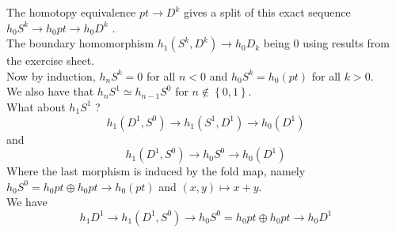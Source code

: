 \documentclass[../main.tex]{subfiles}
\begin{document}
The homotopy equivalence $pt \to D^{k}$ gives a split of this exact sequence $h_0S^{k}\to h_0 pt\to h_0 D^{k}$ .\\
The boundary homomorphism $h_1 ( S^{k},D^{k}) \to h_0 D_k$ being 0 using results from the exercise sheet.\\

Now by induction, $h_n S^{k}=0  $ for all $n< 0$ and $h_0 S^{k}= h_0( pt) $ for all $k>0$.\\
We also have that $h_n S^{1}\simeq h_{n-1} S^{0}$ for $ n \notin \left\{ 0,1 \right\} $.\\
What about $h_1 S^{1}$ ?\\
\[ 
h_1( D^{1},S^{0}) \to h_1( S^{1},D^{1}) \to h_0( D^{1}) 
\]
and 
\[ 
h_1( D^{1},S^{0}) \to h_0 S^{0} \to h_0( D^{1}) 
\]
Where the last morphism is induced by the fold map, namely $h_0S^{0}= h_0 pt \oplus h_0 pt \to h_0( pt) $ and $( x,y) \mapsto x+y$.\\
We have
\[ 
h_1 D^{1}\to h_1 ( D^{1},S^{0}) \to h_0 S^{0} = h_0 pt \oplus h_0 pt\to h_0 D^{1}
\]
\end{document}
